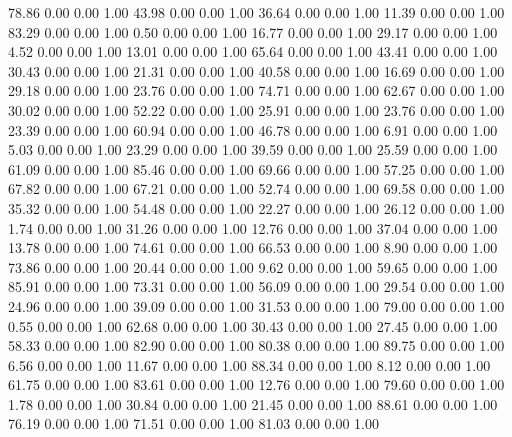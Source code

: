   78.86   0.00   0.00   1.00
   43.98   0.00   0.00   1.00
   36.64   0.00   0.00   1.00
   11.39   0.00   0.00   1.00
   83.29   0.00   0.00   1.00
    0.50   0.00   0.00   1.00
   16.77   0.00   0.00   1.00
   29.17   0.00   0.00   1.00
    4.52   0.00   0.00   1.00
   13.01   0.00   0.00   1.00
   65.64   0.00   0.00   1.00
   43.41   0.00   0.00   1.00
   30.43   0.00   0.00   1.00
   21.31   0.00   0.00   1.00
   40.58   0.00   0.00   1.00
   16.69   0.00   0.00   1.00
   29.18   0.00   0.00   1.00
   23.76   0.00   0.00   1.00
   74.71   0.00   0.00   1.00
   62.67   0.00   0.00   1.00
   30.02   0.00   0.00   1.00
   52.22   0.00   0.00   1.00
   25.91   0.00   0.00   1.00
   23.76   0.00   0.00   1.00
   23.39   0.00   0.00   1.00
   60.94   0.00   0.00   1.00
   46.78   0.00   0.00   1.00
    6.91   0.00   0.00   1.00
    5.03   0.00   0.00   1.00
   23.29   0.00   0.00   1.00
   39.59   0.00   0.00   1.00
   25.59   0.00   0.00   1.00
   61.09   0.00   0.00   1.00
   85.46   0.00   0.00   1.00
   69.66   0.00   0.00   1.00
   57.25   0.00   0.00   1.00
   67.82   0.00   0.00   1.00
   67.21   0.00   0.00   1.00
   52.74   0.00   0.00   1.00
   69.58   0.00   0.00   1.00
   35.32   0.00   0.00   1.00
   54.48   0.00   0.00   1.00
   22.27   0.00   0.00   1.00
   26.12   0.00   0.00   1.00
    1.74   0.00   0.00   1.00
   31.26   0.00   0.00   1.00
   12.76   0.00   0.00   1.00
   37.04   0.00   0.00   1.00
   13.78   0.00   0.00   1.00
   74.61   0.00   0.00   1.00
   66.53   0.00   0.00   1.00
    8.90   0.00   0.00   1.00
   73.86   0.00   0.00   1.00
   20.44   0.00   0.00   1.00
    9.62   0.00   0.00   1.00
   59.65   0.00   0.00   1.00
   85.91   0.00   0.00   1.00
   73.31   0.00   0.00   1.00
   56.09   0.00   0.00   1.00
   29.54   0.00   0.00   1.00
   24.96   0.00   0.00   1.00
   39.09   0.00   0.00   1.00
   31.53   0.00   0.00   1.00
   79.00   0.00   0.00   1.00
    0.55   0.00   0.00   1.00
   62.68   0.00   0.00   1.00
   30.43   0.00   0.00   1.00
   27.45   0.00   0.00   1.00
   58.33   0.00   0.00   1.00
   82.90   0.00   0.00   1.00
   80.38   0.00   0.00   1.00
   89.75   0.00   0.00   1.00
    6.56   0.00   0.00   1.00
   11.67   0.00   0.00   1.00
   88.34   0.00   0.00   1.00
    8.12   0.00   0.00   1.00
   61.75   0.00   0.00   1.00
   83.61   0.00   0.00   1.00
   12.76   0.00   0.00   1.00
   79.60   0.00   0.00   1.00
    1.78   0.00   0.00   1.00
   30.84   0.00   0.00   1.00
   21.45   0.00   0.00   1.00
   88.61   0.00   0.00   1.00
   76.19   0.00   0.00   1.00
   71.51   0.00   0.00   1.00
   81.03   0.00   0.00   1.00
